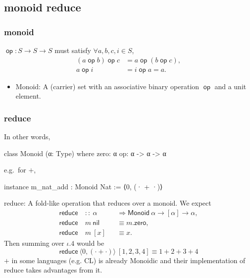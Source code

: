 \documentclass{beamer}
\DeclareMathOperator{\op}{\mathsf{op}}
\begin{document}
\subsection{monoid reduce}
\begin{frame}
    \frametitle{monoid}
    $\op: S\to S\to S$ must satisfy $\forall a,b,c,i\in S$,
    \begin{align*}
        (a \op b) \op c & = a \op (b \op c) \tag*{Associativity}, \\
        a \op i         & = i \op a = a \tag*{Identity}.
    \end{align*}
    \begin{itemize}
        \item \textsf{Monoid}: A (carrier) set with an associative binary operation $\op$ and a unit element.
    \end{itemize}

\end{frame}
\begin{frame}[fragile]
    \frametitle{reduce}
    In other words,

    \begin{leancode}
        class Monoid (α: Type) where
            zero: α
            op: α -> α -> α
    \end{leancode}

    e.g.\ for $+$,

    \begin{leancode}
        instance m_nat_add : Monoid Nat := ⟨0, (· + ·)⟩
    \end{leancode}

    \textsf{reduce}: A fold-like operation that reduces over a monoid. We expect
    \begin{align*}
        \mathsf{reduce} & \ ::\ \alpha      &  & \Rightarrow \textsf{Monoid}\ \alpha \to [\alpha] \to \alpha, \\
        \mathsf{reduce} & \ m\ \mathsf{nil} &  & \equiv m.\mathsf{zero},                                      \\
        \mathsf{reduce} & \ m\ [x]          &  & \equiv x.
    \end{align*}
    Then summing over $\iota.4$ would be
    \begin{equation*}
        \mathsf{reduce}\ \langle 0,(\cdot + \cdot)\rangle\ [1,2,3,4] \equiv 1 + 2 + 3 + 4
    \end{equation*}
    $+$ in some languages (e.g. CL) is already Monoidic and their implementation of reduce takes advantages from it.
\end{frame}
\end{document}

